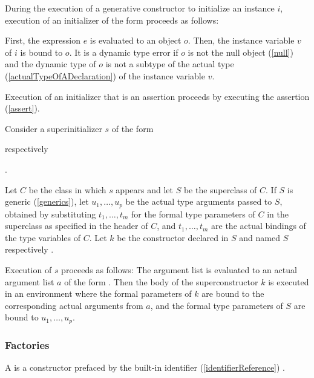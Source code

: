 \documentclass[makeidx]{article}
\begin{document}
\LMHash{}%
During the execution of a generative constructor to initialize an instance $i$,
execution of an initializer of the form 
proceeds as follows:

\LMHash{}%
First, the expression $e$ is evaluated to an object $o$.
Then, the instance variable $v$ of $i$ is bound to $o$.
It is a dynamic type error if $o$ is not the null object
(\ref{null})
and the dynamic type of $o$ is not a subtype of the actual type
(\ref{actualTypeOfADeclaration})
of the instance variable $v$.

\LMHash{}%
Execution of an initializer that is an assertion proceeds by executing the assertion (\ref{assert}).

\LMHash{}%
Consider a superinitializer $s$ of the form

respectively

.

\LMHash{}%
Let $C$ be the class in which $s$ appears and let $S$ be the superclass of $C$.
If $S$ is generic (\ref{generics}),
let $u_1, \ldots, u_p$ be the actual type arguments passed to $S$,
obtained by substituting $t_1, \ldots, t_m$
for the formal type parameters of $C$
in the superclass as specified in the header of $C$, and
$t_1, \ldots, t_m$
are the actual bindings of the type variables of $C$.
Let $k$ be the constructor declared in $S$ and named
$S$ respectively .

\LMHash{}%
Execution of $s$ proceeds as follows:
The argument list
is evaluated to an actual argument list $a$ of the form
.
Then the body of the superconstructor $k$ is executed
in an environment where the formal parameters of $k$ are bound to
the corresponding actual arguments from $a$,
and the formal type parameters of $S$ are bound to $u_1, \ldots, u_p$.


\subsubsection{Factories}

\LMHash{}%
A 
is a constructor prefaced by the built-in identifier
(\ref{identifierReference})
\FACTORY{}.
\end{document}

